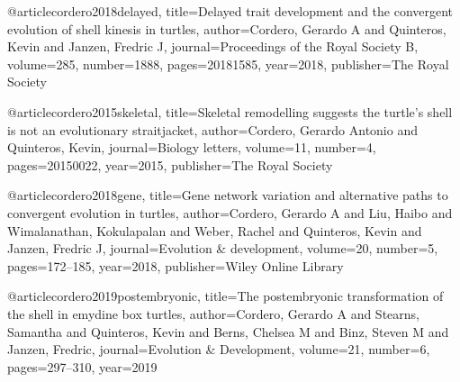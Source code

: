 @article{cordero2018delayed,
  title={Delayed trait development and the convergent evolution of shell kinesis in turtles},
  author={Cordero, Gerardo A and Quinteros, Kevin and Janzen, Fredric J},
  journal={Proceedings of the Royal Society B},
  volume={285},
  number={1888},
  pages={20181585},
  year={2018},
  publisher={The Royal Society}
}

@article{cordero2015skeletal,
  title={Skeletal remodelling suggests the turtle's shell is not an evolutionary straitjacket},
  author={Cordero, Gerardo Antonio and Quinteros, Kevin},
  journal={Biology letters},
  volume={11},
  number={4},
  pages={20150022},
  year={2015},
  publisher={The Royal Society}
}

@article{cordero2018gene,
  title={Gene network variation and alternative paths to convergent evolution in turtles},
  author={Cordero, Gerardo A and Liu, Haibo and Wimalanathan, Kokulapalan and Weber, Rachel and Quinteros, Kevin and Janzen, Fredric J},
  journal={Evolution \& development},
  volume={20},
  number={5},
  pages={172--185},
  year={2018},
  publisher={Wiley Online Library}
}

@article{cordero2019postembryonic,
  title={The postembryonic transformation of the shell in emydine box turtles},
  author={Cordero, Gerardo A and Stearns, Samantha and Quinteros, Kevin and Berns, Chelsea M and Binz, Steven M and Janzen, Fredric},
  journal={Evolution \& Development},
  volume={21},
  number={6},
  pages={297--310},
  year={2019}
}



